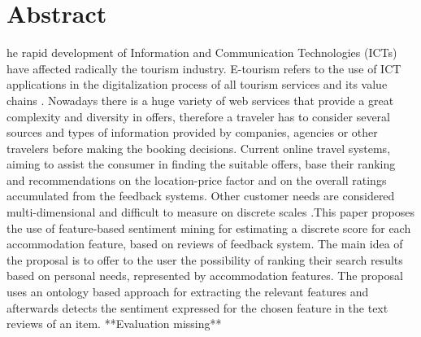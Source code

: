 %
%
%
\let\cleardoublepage\clearpage
\chapter{Abstract}
\begin{SingleSpace}
he rapid development of Information and Communication Technologies (ICTs) have affected radically the tourism industry. E-tourism refers to the use of ICT applications in the digitalization process of all tourism services and its value chains \cite{buhalis2003etourism}. Nowadays there is a huge variety of web services that provide a great complexity and diversity in offers, therefore a traveler has to consider several sources and types of information provided by companies, agencies or other travelers before making the booking decisions. Current online travel systems, aiming to assist the consumer in finding the suitable offers, base their ranking and recommendations on the location-price factor and on the overall ratings accumulated from the feedback systems. Other customer needs are considered multi-dimensional and difficult to measure on discrete scales \cite{luo2005information}.This paper proposes the use of feature-based sentiment mining for estimating a discrete score for each accommodation feature, based on reviews of feedback system. The main idea of the proposal is to offer to the user the possibility of ranking their search results based on personal needs, represented by accommodation features. The proposal uses an ontology based approach for extracting the relevant features and afterwards detects the sentiment expressed for the chosen feature in the text reviews of an item. **Evaluation missing**
\end{SingleSpace}
\clearpage